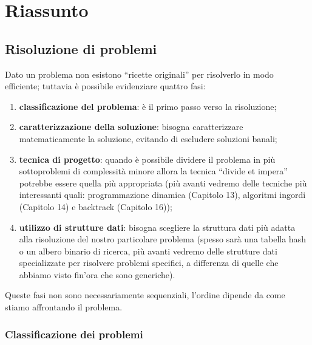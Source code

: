 
\ifsubfile
\usepackage{../settings/subfile}
\setcounter{chapter}{20}


\fi
\chapter{Riassunto}

\section*{Risoluzione di problemi}

Dato un problema non esistono \enquote{ricette originali} per risolverlo in modo efficiente;
tuttavia è possibile evidenziare quattro fasi:
\begin{enumerate}
	\item \textbf{classificazione del problema}: è il primo passo verso la risoluzione;
	\item \textbf{caratterizzazione della soluzione}: bisogna caratterizzare matematicamente la soluzione, evitando di escludere soluzioni banali;
	\item \textbf{tecnica di progetto}: quando è possibile dividere il problema in più sottoproblemi di complessità minore allora la tecnica \enquote{divide et impera} potrebbe essere quella più appropriata (più avanti vedremo delle tecniche più interessanti quali: programmazione dinamica (Capitolo 13), algoritmi ingordi (Capitolo 14) e backtrack (Capitolo 16));
	\item \textbf{utilizzo di strutture dati}: bisogna scegliere la struttura dati più adatta alla risoluzione del nostro particolare problema (spesso sarà una tabella hash o un albero binario di ricerca, più avanti vedremo delle strutture dati specializzate per risolvere problemi specifici, a differenza di quelle che abbiamo visto fin'ora che sono generiche).
\end{enumerate}
Queste fasi non sono necessariamente sequenziali, l'ordine dipende da come stiamo affrontando il problema.

\subsection*{Classificazione dei problemi}

